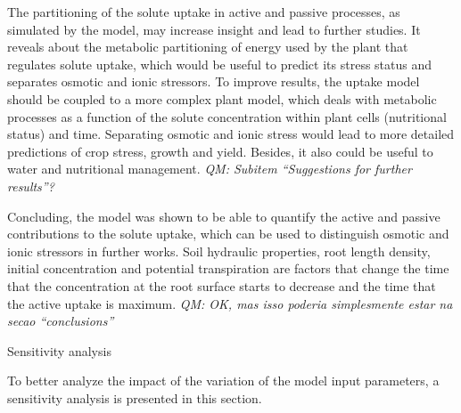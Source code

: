 %
{\tred 
The partitioning of the solute uptake in active and passive processes, as simulated by the model, may increase insight and lead to further studies. 
It reveals about the metabolic partitioning of energy used by the plant that regulates solute uptake, which would be useful to predict its stress status and separates osmotic and ionic stressors.
To improve results, the uptake model should be coupled to a more complex plant model, which deals with metabolic processes as a function of the solute concentration within plant cells (nutritional status) and time.
Separating osmotic and ionic stress would lead to more detailed predictions of crop stress, growth and yield.
Besides, it also could be useful to water and nutritional management.
{\it QM: Subitem ``Suggestions for further results''?}}


{\tred Concluding, the model was shown to be able to quantify the active and passive contributions to the solute uptake, which can be used to distinguish osmotic and ionic stressors in further works.
Soil hydraulic properties, root length density, initial concentration and potential transpiration are factors that change the time that the concentration at the root surface starts to decrease and the time that the active uptake is maximum. {\it QM: OK, mas isso poderia simplesmente estar na secao ``conclusions''}}



\sec Sensitivity analysis 

To better analyze the impact of the variation of the model input parameters, a sensitivity analysis is presented in this section.

